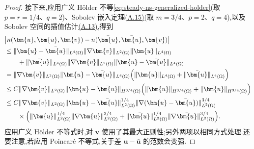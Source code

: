 \begin{lemma}[非线性对流项差的估计]
\begin{proof}
接下来,应用广义 Hölder 不等\cref{eq:steady-ns-generalized-holder}(取 $p=r=1/4$、$q=2$)、Sobolev 嵌入定理\hyperref[eq:appendix-a-15]{(A.15)}(取 $m=3/4$、$p=2$、$q=4$),以及 Sobolev 空间的插值估计\hyperref[eq:appendix-a-13]{(A.13)},得到
\[
\begin{aligned}
  &\bigl|n(\bm{u},\bm{u},\bm{v})
      -n(\bar{\bm{u}},\bar{\bm{u}},\bm{v})\bigr|\\
  &\leq \lVert\bm{u}-\bar{\bm{u}}\rVert_{L^4(\Omega)}
       \lVert\nabla\bm{v}\rVert_{L^2(\Omega)}
       \lVert\bm{u}\rVert_{L^4(\Omega)}\\
  &\qquad+\lVert\bar{\bm{u}}\rVert_{L^4(\Omega)}
       \lVert\nabla\bm{v}\rVert_{L^2(\Omega)}
       \lVert\bm{u}-\bar{\bm{u}}\rVert_{L^4(\Omega)}\\
  &=\lVert\nabla\bm{v}\rVert_{L^2(\Omega)}
      \lVert\bm{u}-\bar{\bm{u}}\rVert_{L^4(\Omega)}
      \Bigl(\lVert\bm{u}\rVert_{L^4(\Omega)}
        +\lVert\bar{\bm{u}}\rVert_{L^4(\Omega)}\Bigr)\\
  &\leq C\lVert\nabla\bm{v}\rVert_{L^2(\Omega)}
      \lVert\bm{u}-\bar{\bm{u}}\rVert_{H^{3/4}(\Omega)}
      \Bigl(\lVert\bm{u}\rVert_{H^{3/4}(\Omega)}
        +\lVert\bar{\bm{u}}\rVert_{H^{3/4}(\Omega)}\Bigr)\\
  &\leq C\lVert\nabla\bm{v}\rVert_{L^2(\Omega)}
      \lVert\bm{u}-\bar{\bm{u}}\rVert_{L^2(\Omega)}^{1/4}
      \lVert\nabla(\bm{u}-\bar{\bm{u}})\rVert_{L^2(\Omega)}^{3/4}\\
  &\qquad\times\Bigl(
       \lVert\bm{u}\rVert_{L^2(\Omega)}^{1/4}
       \lVert\nabla\bm{u}\rVert_{L^2(\Omega)}^{3/4}
       +\lVert\bar{\bm{u}}\rVert_{L^2(\Omega)}^{1/4}
       \lVert\nabla\bar{\bm{u}}\rVert_{L^2(\Omega)}^{3/4}
       \Bigr).
\end{aligned}
\]
应用广义 Hölder 不等式时,对 $\bm{v}$ 使用了其最大正则性;另外两项以相同方式处理.还要注意,若应用 Poincaré 不等式,关于差 $\bm{u}-\bar{\bm{u}}$ 的范数会变强.


\end{proof}
\end{lemma}
